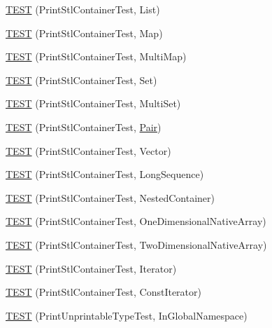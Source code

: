 \begin{DoxyCompactItemize}
\item 
\hyperlink{namespacetesting_1_1gtest__printers__test_aaa135672ff79ecaef82c6046f2ab8d29}{T\+E\+ST} (Print\+Stl\+Container\+Test, List)
\item 
\hyperlink{namespacetesting_1_1gtest__printers__test_a3d701a1866f260a42411e9041894c49c}{T\+E\+ST} (Print\+Stl\+Container\+Test, Map)
\item 
\hyperlink{namespacetesting_1_1gtest__printers__test_a8a498c956a5b1c0358d126e1ad56fac0}{T\+E\+ST} (Print\+Stl\+Container\+Test, Multi\+Map)
\item 
\hyperlink{namespacetesting_1_1gtest__printers__test_abdc498462741033074f8e86b7c0bd480}{T\+E\+ST} (Print\+Stl\+Container\+Test, Set)
\item 
\hyperlink{namespacetesting_1_1gtest__printers__test_adaa3e1cfa3feca377b3958edb41fc0f1}{T\+E\+ST} (Print\+Stl\+Container\+Test, Multi\+Set)
\item 
\hyperlink{namespacetesting_1_1gtest__printers__test_ad5d3e873b00c1c9e3f5924e106dd7831}{T\+E\+ST} (Print\+Stl\+Container\+Test, \hyperlink{namespacetesting_ac7520de8af26d3085513eeeb68561889}{Pair})
\item 
\hyperlink{namespacetesting_1_1gtest__printers__test_abfab1ea62f0285c0cdbcca500be0dac8}{T\+E\+ST} (Print\+Stl\+Container\+Test, Vector)
\item 
\hyperlink{namespacetesting_1_1gtest__printers__test_a55eca253f3365ad26183bcc711cb257a}{T\+E\+ST} (Print\+Stl\+Container\+Test, Long\+Sequence)
\item 
\hyperlink{namespacetesting_1_1gtest__printers__test_ad8fb463805baecdfb95154dec6ec4f27}{T\+E\+ST} (Print\+Stl\+Container\+Test, Nested\+Container)
\item 
\hyperlink{namespacetesting_1_1gtest__printers__test_a6dd59bbdea483f662fe62e2c55c106ce}{T\+E\+ST} (Print\+Stl\+Container\+Test, One\+Dimensional\+Native\+Array)
\item 
\hyperlink{namespacetesting_1_1gtest__printers__test_aca371c218e2248562ed258eaf385f4d1}{T\+E\+ST} (Print\+Stl\+Container\+Test, Two\+Dimensional\+Native\+Array)
\item 
\hyperlink{namespacetesting_1_1gtest__printers__test_a01ec32faf0032f9fbcf4895d8d6e4aa9}{T\+E\+ST} (Print\+Stl\+Container\+Test, Iterator)
\item 
\hyperlink{namespacetesting_1_1gtest__printers__test_a3b54f9a039804190b7ff2e818169c0f2}{T\+E\+ST} (Print\+Stl\+Container\+Test, Const\+Iterator)
\item 
\hyperlink{namespacetesting_1_1gtest__printers__test_a805264fd24de8e65cba977a798abc54c}{T\+E\+ST} (Print\+Unprintable\+Type\+Test, In\+Global\+Namespace)

\end{DoxyCompactItemize}

